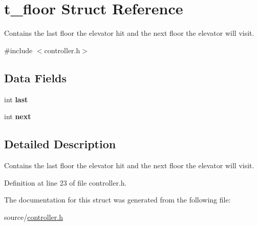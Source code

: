 \hypertarget{structt__floor}{}\section{t\+\_\+floor Struct Reference}
\label{structt__floor}


Contains the last floor the elevator hit and the next floor the elevator will visit.  




{\ttfamily \#include $<$controller.\+h$>$}

\subsection*{Data Fields}
\begin{DoxyCompactItemize}
\item 
int {\bfseries last}\hypertarget{structt__floor_ac7106a034da33a30e4bbac53b7ae9883}{}\label{structt__floor_ac7106a034da33a30e4bbac53b7ae9883}

\item 
int {\bfseries next}\hypertarget{structt__floor_af5f488e9cfc49388b0b2c58d31ef50ee}{}\label{structt__floor_af5f488e9cfc49388b0b2c58d31ef50ee}

\end{DoxyCompactItemize}


\subsection{Detailed Description}
Contains the last floor the elevator hit and the next floor the elevator will visit. 

Definition at line 23 of file controller.\+h.



The documentation for this struct was generated from the following file\+:\begin{DoxyCompactItemize}
\item 
source/\hyperlink{controller_8h}{controller.\+h}\end{DoxyCompactItemize}
